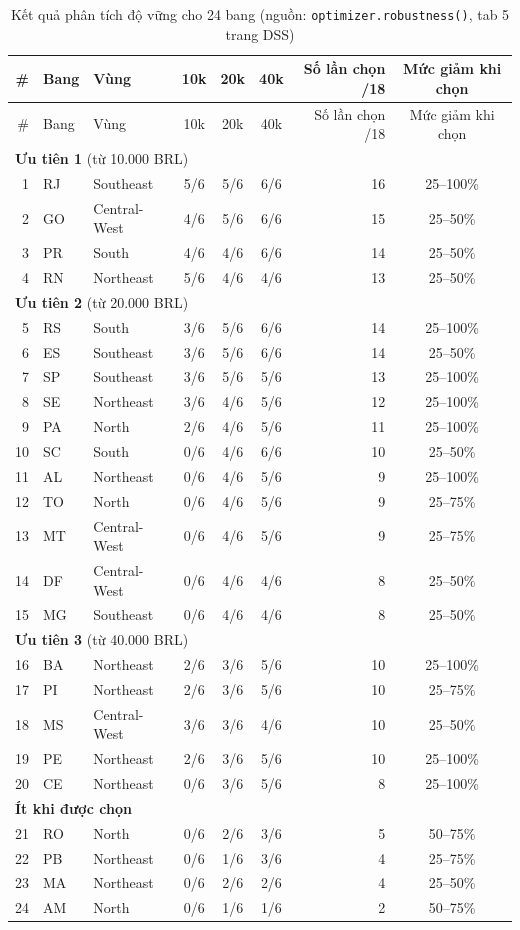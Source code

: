 \documentclass[12pt,a4paper]{report}
\newcommand{\code}[1]{\texttt{#1}}
\renewcommand{\_}{\oldunderscore\allowbreak}
\begin{document}
\begingroup\small
\begin{longtable}{rllcccrc}
\caption{Kết quả phân tích độ vững cho 24 bang (nguồn: \code{optimizer.robustness()}, tab 5 trang DSS)}\label{tab:robust}\\
\toprule
\# & Bang & Vùng & 10k & 20k & 40k & Số lần chọn /18 & Mức giảm khi chọn \\
\midrule\endfirsthead
\toprule
\# & Bang & Vùng & 10k & 20k & 40k & Số lần chọn /18 & Mức giảm khi chọn \\
\midrule\endhead
\multicolumn{8}{l}{\textbf{Ưu tiên 1} (từ 10.000 BRL)} \\
1 & RJ & Southeast & 5/6 & 5/6 & 6/6 & 16 & 25--100\% \\
2 & GO & Central-West & 4/6 & 5/6 & 6/6 & 15 & 25--50\% \\
3 & PR & South & 4/6 & 4/6 & 6/6 & 14 & 25--50\% \\
4 & RN & Northeast & 5/6 & 4/6 & 4/6 & 13 & 25--50\% \\
\multicolumn{8}{l}{\textbf{Ưu tiên 2} (từ 20.000 BRL)} \\
5 & RS & South & 3/6 & 5/6 & 6/6 & 14 & 25--100\% \\
6 & ES & Southeast & 3/6 & 5/6 & 6/6 & 14 & 25--50\% \\
7 & SP & Southeast & 3/6 & 5/6 & 5/6 & 13 & 25--100\% \\
8 & SE & Northeast & 3/6 & 4/6 & 5/6 & 12 & 25--100\% \\
9 & PA & North & 2/6 & 4/6 & 5/6 & 11 & 25--100\% \\
10 & SC & South & 0/6 & 4/6 & 6/6 & 10 & 25--50\% \\
11 & AL & Northeast & 0/6 & 4/6 & 5/6 & 9 & 25--100\% \\
12 & TO & North & 0/6 & 4/6 & 5/6 & 9 & 25--75\% \\
13 & MT & Central-West & 0/6 & 4/6 & 5/6 & 9 & 25--75\% \\
14 & DF & Central-West & 0/6 & 4/6 & 4/6 & 8 & 25--50\% \\
15 & MG & Southeast & 0/6 & 4/6 & 4/6 & 8 & 25--50\% \\
\multicolumn{8}{l}{\textbf{Ưu tiên 3} (từ 40.000 BRL)} \\
16 & BA & Northeast & 2/6 & 3/6 & 5/6 & 10 & 25--100\% \\
17 & PI & Northeast & 2/6 & 3/6 & 5/6 & 10 & 25--75\% \\
18 & MS & Central-West & 3/6 & 3/6 & 4/6 & 10 & 25--50\% \\
19 & PE & Northeast & 2/6 & 3/6 & 5/6 & 10 & 25--100\% \\
20 & CE & Northeast & 0/6 & 3/6 & 5/6 & 8 & 25--100\% \\
\multicolumn{8}{l}{\textbf{Ít khi được chọn}} \\
21 & RO & North & 0/6 & 2/6 & 3/6 & 5 & 50--75\% \\
22 & PB & Northeast & 0/6 & 1/6 & 3/6 & 4 & 25--75\% \\
23 & MA & Northeast & 0/6 & 2/6 & 2/6 & 4 & 25--50\% \\
24 & AM & North & 0/6 & 1/6 & 1/6 & 2 & 50--75\% \\
\bottomrule
\end{longtable}
\endgroup
\end{document}
